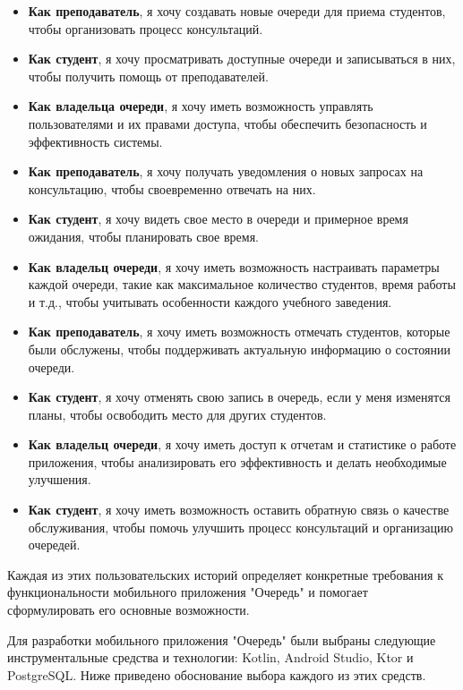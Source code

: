 \begin{itemize}
	\item \textbf{Как преподаватель}, я хочу создавать новые очереди
		для приема студентов, чтобы организовать процесс консультаций.
	\item \textbf{Как студент}, я хочу просматривать доступные очереди
		и записываться в них, чтобы получить помощь от преподавателей.
	\item \textbf{Как владельца очереди}, я хочу иметь возможность управлять
		пользователями и их правами доступа, чтобы обеспечить безопасность
		и эффективность системы.
	\item \textbf{Как преподаватель}, я хочу получать уведомления
		о новых запросах на консультацию, чтобы своевременно отвечать на них.
	\item \textbf{Как студент}, я хочу видеть свое место в очереди
		и примерное время ожидания, чтобы планировать свое время.
	\item \textbf{Как владельц очереди}, я хочу иметь возможность настраивать
		параметры каждой очереди, такие как максимальное количество студентов,
		время работы и т.д.,
		чтобы учитывать особенности каждого учебного заведения.
	\item \textbf{Как преподаватель}, я хочу иметь возможность отмечать
		студентов, которые были обслужены,
		чтобы поддерживать актуальную информацию о состоянии очереди.
	\item \textbf{Как студент}, я хочу отменять свою запись в очередь,
		если у меня изменятся планы,
		чтобы освободить место для других студентов.
	\item \textbf{Как владельц очереди}, я хочу иметь доступ к отчетам
		и статистике о работе приложения,
		чтобы анализировать его эффективность и делать необходимые улучшения.
	\item \textbf{Как студент}, я хочу иметь возможность оставить обратную
		связь о качестве обслуживания,
		чтобы помочь улучшить процесс консультаций и организацию очередей.
\end{itemize}

Каждая из этих пользовательских историй определяет конкретные требования
к функциональности мобильного приложения "Очередь"
и помогает сформулировать его основные возможности.


Для разработки мобильного приложения "Очередь"
были выбраны следующие инструментальные средства и технологии:
Kotlin, Android Studio, Ktor и PostgreSQL.
Ниже приведено обоснование выбора каждого из этих средств.


